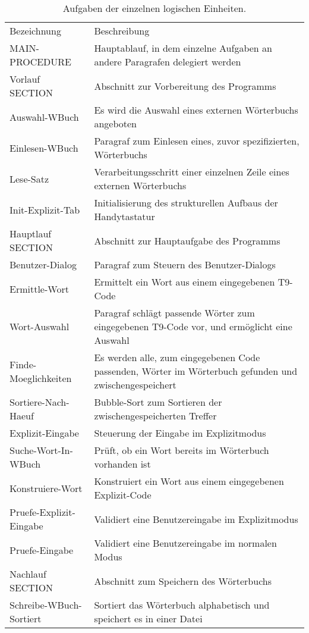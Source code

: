 \begin{table}[!htb]
    \centering
    \begin{tabularx}{\textwidth}{X | X }
       \rowcolor{fhfarbe!25}
       Bezeichnung                             & Beschreibung             \\
       MAIN-PROCEDURE & Hauptablauf, in dem einzelne Aufgaben an andere Paragrafen delegiert werden \\
       \rowcolor{fhfarbe!10}
       Vorlauf SECTION & Abschnitt zur Vorbereitung des Programms  \\
       Auswahl-WBuch & Es wird die Auswahl eines externen Wörterbuchs angeboten  \\
       Einlesen-WBuch & Paragraf zum Einlesen eines, zuvor spezifizierten, Wörterbuchs  \\
       Lese-Satz & Verarbeitungsschritt einer einzelnen Zeile eines externen Wörterbuchs   \\
       Init-Explizit-Tab & Initialisierung des strukturellen Aufbaus der Handytastatur  \\
       \rowcolor{fhfarbe!10}
       Hauptlauf SECTION & Abschnitt zur Hauptaufgabe des Programms  \\
       Benutzer-Dialog & Paragraf zum Steuern des Benutzer-Dialogs \\
       Ermittle-Wort & Ermittelt ein Wort aus einem eingegebenen T9-Code  \\
       Wort-Auswahl &  Paragraf schlägt passende Wörter zum eingegebenen T9-Code vor, und ermöglicht eine Auswahl \\
       Finde-Moeglichkeiten & Es werden alle, zum eingegebenen Code passenden, Wörter im Wörterbuch gefunden und zwischengespeichert   \\
       Sortiere-Nach-Haeuf & Bubble-Sort zum Sortieren der zwischengespeicherten Treffer  \\
       Explizit-Eingabe & Steuerung der Eingabe im Explizitmodus  \\
       Suche-Wort-In-WBuch & Prüft, ob ein Wort bereits im Wörterbuch vorhanden ist  \\
       Konstruiere-Wort & Konstruiert ein Wort aus einem eingegebenen Explizit-Code  \\
       Pruefe-Explizit-Eingabe &  Validiert eine Benutzereingabe im Explizitmodus \\
       Pruefe-Eingabe & Validiert eine Benutzereingabe im normalen Modus \\
       \rowcolor{fhfarbe!10}
       Nachlauf SECTION & Abschnitt zum Speichern des Wörterbuchs \\
       Schreibe-WBuch-Sortiert &  Sortiert das Wörterbuch alphabetisch und speichert es in einer Datei \\
    \end{tabularx}
    \caption{Aufgaben der einzelnen logischen Einheiten.}\label{tab:prog-strukt}
\end{table}
